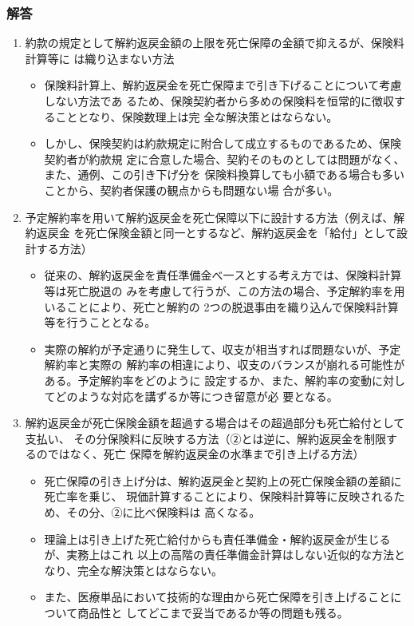 \documentclass[report,gutter=10mm,fore-edge=10mm,uplatex,dvipdfmx]{jlreq}
\begin{document}
\subsubsection{解答}
\begin{enumerate}
 \item 約款の規定として解約返戻金額の上限を死亡保障の金額で抑えるが、保険料計算等に
は織り込まない方法
\begin{itemize}
 \item 保険料計算上、解約返戻金を死亡保障まで引き下げることについて考慮しない方法であ
るため、保険契約者から多めの保険料を恒常的に徴収することとなり、保険数理上は完
全な解決策とはならない。
 \item しかし、保険契約は約款規定に附合して成立するものであるため、保険契約者が約款規
定に合意した場合、契約そのものとしては問題がなく、また、通例、この引き下げ分を
保険料換算しても小額である場合も多いことから、契約者保護の観点からも問題ない場
合が多い。
\end{itemize}
 \item 予定解約率を用いて解約返戻金を死亡保障以下に設計する方法（例えば、解約返戻金
を死亡保険金額と同一とするなど、解約返戻金を「給付」として設計する方法）
\begin{itemize}
 \item 従来の、解約返戻金を責任準備金べ一スとする考え方では、保険料計算等は死亡脱退の
みを考慮して行うが、この方法の場合、予定解約率を用いることにより、死亡と解約の
2つの脱退事由を織り込んで保険料計算等を行うこととなる。
 \item 実際の解約が予定通りに発生して、収支が相当すれば問題ないが、予定解約率と実際の
解約率の相違により、収支のバランスが崩れる可能性がある。予定解約率をどのように
設定するか、また、解約率の変動に対してどのような対応を講ずるか等につき留意が必
要となる。
\end{itemize}
 \item 解約返戻金が死亡保険金額を超過する場合はその超過部分も死亡給付として支払い、
その分保険料に反映する方法（②とは逆に、解約返戻金を制限するのではなく、死亡
保障を解約返戻金の水準まで引き上げる方法）
\begin{itemize}
 \item 死亡保障の引き上げ分は、解約返戻金と契約上の死亡保険金額の差額に死亡率を乗じ、
現価計算することにより、保険料計算等に反映されるため、その分、②に比べ保険料は
高くなる。
 \item 理論上は引き上げた死亡給付からも責任準備金・解約返戻金が生じるが、実務上はこれ
以上の高階の責任準備金計算はしない近似的な方法となり、完全な解決策とはならない。
 \item また、医療単品において技術的な理由から死亡保障を引き上げることについて商品性と
してどこまで妥当であるか等の問題も残る。
\end{itemize}
\end{enumerate}
\end{document}
